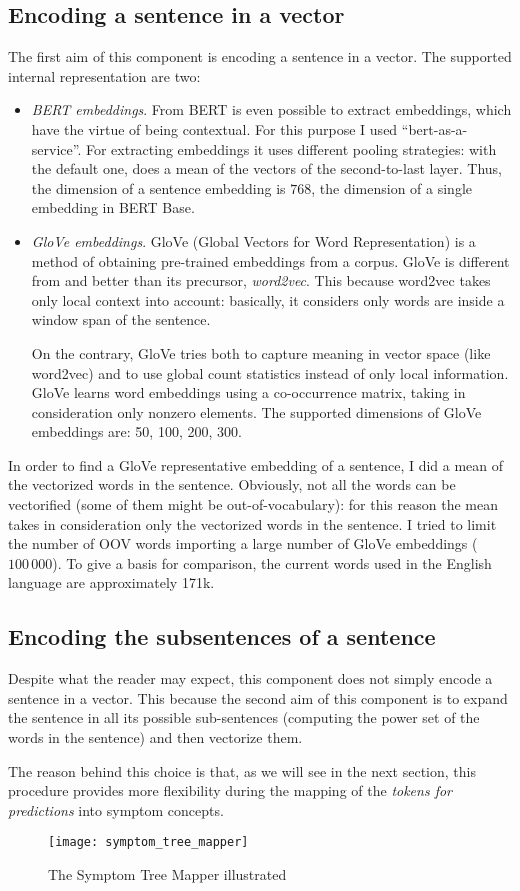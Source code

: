 \subsection{Encoding a sentence in a vector}
The first aim of this component is encoding a sentence in a vector. The supported internal representation are two:
\begin{itemize}
  \item \textit{BERT embeddings}. From BERT is even possible to extract embeddings, which have the virtue of being contextual. For this purpose I used ``bert-as-a-service''. For extracting embeddings it uses different pooling strategies: with the default one, does a mean of the vectors of the second-to-last layer. Thus, the dimension of a sentence embedding is $768$, the dimension of a single embedding in BERT Base.
  \item \textit{GloVe embeddings}. GloVe (Global Vectors for Word Representation) is a method of obtaining pre-trained embeddings from a corpus. GloVe is different from and better than its precursor, \textit{word2vec}. This because word2vec takes only local context into account: basically, it considers only words are inside a window span of the sentence.
  
  On the contrary, GloVe tries both to capture meaning in vector space (like word2vec) and to use global count statistics instead of only local information. GloVe learns word embeddings using a co-occurrence matrix, taking in consideration only nonzero elements. The supported dimensions of GloVe embeddings are: 50, 100, 200, 300.
\end{itemize}

In order to find a GloVe representative embedding of a sentence, I did a mean of the vectorized words in the sentence. Obviously, not all the words can be vectorified (some of them might be out-of-vocabulary): for this reason the mean takes in consideration only the vectorized words in the sentence. I tried to limit the number of OOV words importing a large number of GloVe embeddings ($100\,000$). To give a basis for comparison, the current words used in the English language are approximately 171k.

\subsection{Encoding the subsentences of a sentence}
Despite what the reader may expect, this component does not simply encode a sentence in a vector. This because the second aim of this component is to expand the sentence in all its possible sub-sentences (computing the power set of the words in the sentence) and then vectorize them.

The reason behind this choice is that, as we will see in the next section, this procedure provides more flexibility during the mapping of the \textit{tokens for predictions} into symptom concepts.

\begin{figure}[h]
\centering
\texttt{[image: symptom\_tree\_mapper]}
\caption{The Symptom Tree Mapper illustrated}
\medskip
\label{fig:symptom_t_m}
\end{figure}
